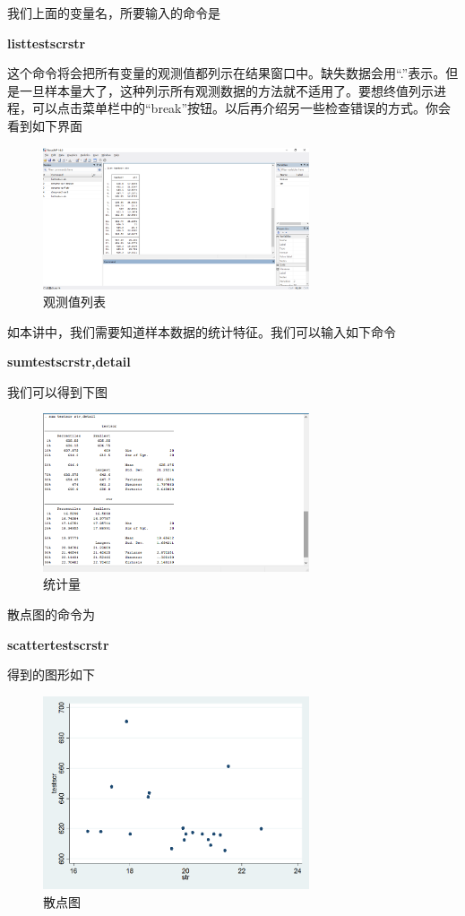 \documentclass[cn,10pt,math=newtx,citestyle=gb7714-2015,bibstyle=gb7714-2015]{elegantbook}
\begin{document}
	我们上面的变量名，所要输入的命令是
	
	\textbf{list\quad testscr\quad str}
	
	这个命令将会把所有变量的观测值都列示在结果窗口中。缺失数据会用“.”表示。但是一旦样本量大了，这种列示所有观测数据的方法就不适用了。要想终值列示进程，可以点击菜单栏中的“break”按钮。以后再介绍另一些检查错误的方式。你会看到如下界面
	\begin{figure}[htbp]
		\centering
		\includegraphics[width=0.7\textwidth]{list.png}
		\caption{观测值列表}\label{fig:digit}
	\end{figure}
	
	如本讲中，我们需要知道样本数据的统计特征。我们可以输入如下命令
	
	\textbf{sum\quad testscr\quad str,detail}
	
	我们可以得到下图
	\begin{figure}[htbp]
		\centering
		\includegraphics[width=0.7\textwidth]{sum.png}
		\caption{统计量}\label{fig:digit}
	\end{figure}
	
	散点图的命令为
	
	\textbf{scatter\quad testscr\quad str}
	
	得到的图形如下
	\begin{figure}[htbp]
		\centering
		\includegraphics[width=0.7\textwidth]{Graph.png}
		\caption{散点图}\label{fig:digit}
	\end{figure}
	
\end{document}
